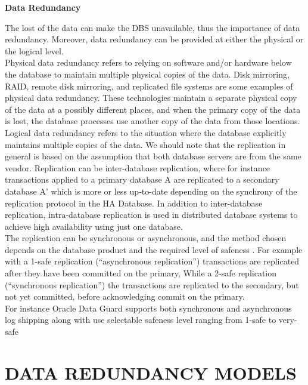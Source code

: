 \documentclass[english]{tktltiki2}
\theoremstyle{definition}
\theoremstyle{remark}
\begin{document}
\begin{flushleft}
\textbf{Data Redundancy}
\end{flushleft}
The lost of the data can make the DBS unavailable, thus the importance of data redundancy. Moreover, data redundancy can be provided at either the physical or the logical level.\\
Physical data redundancy refers to relying on software and/or hardware below the database to maintain multiple physical copies of the data. Disk mirroring, RAID, remote disk mirroring, and replicated file systems are some examples of physical data redundancy. 
These technologies maintain a separate physical copy of the data at a possibly different places, and when the primary copy of the data is lost, the database processes use another copy of the data from those locations.\\
Logical data redundancy refers to the situation where the database explicitly maintains multiple copies of the data. We should note that the replication in general is based on the assumption that both database servers are from the same vendor. Replication can be inter-database replication, where for instance transactions applied to a primary database A are
replicated to a secondary database A’ which is more or less up-to-date depending on the synchrony of the replication protocol in the HA Database. In addition to inter-database replication, intra-database replication is used in distributed database systems to achieve high availability using just one database.\\
The replication can be synchronous or asynchronous, and the method chosen depends on the database product and the required level of safeness \cite{Gray:1992:TPC:573304}. For example with a 1-safe replication (“asynchronous replication”) transactions are replicated after they have been committed on the primary, While a 2-safe replication (“synchronous replication”) the transactions are replicated to the secondary, but not yet committed, before acknowledging commit on the primary.\\
For instance Oracle Data Guard \cite{Oracle} supports both synchronous and asynchronous log shipping along with use selectable safeness level ranging from 1-safe to very-safe

\pagebreak


\section{DATA REDUNDANCY MODELS}
\end{document}
